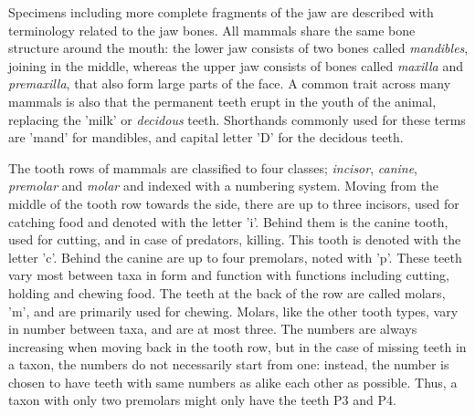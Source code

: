 \documentclass[english,twoside,openright]{HYgraduMLDS}
\begin{document}
Specimens including more complete fragments of the jaw are described with terminology related 
to the jaw bones. All mammals share the same bone structure around the mouth: the lower jaw consists 
of two bones called \textit{mandibles}, joining in the middle, whereas the upper jaw consists of bones called 
\textit{maxilla} and \textit{premaxilla}, that also form large parts of the face.
A common trait across many mammals is also that the permanent teeth erupt in the 
youth of the animal, replacing the 'milk' or \textit{decidous} teeth. Shorthands commonly used for these 
terms are 'mand' for mandibles, and capital letter 'D' for the decidous teeth.

The tooth rows of mammals are classified to four classes; \textit{incisor}, \textit{canine}, \textit{premolar}
and \textit{molar} and indexed with a numbering system. Moving from the middle of the tooth row
towards the side, there are up to three 
incisors, used for catching food and denoted with the letter 'i'. Behind them is the canine tooth, used for cutting, and 
in case of predators, killing. This tooth is denoted with the letter 'c'. Behind the canine are up to four premolars, noted with 'p'. These 
teeth vary most between taxa in form and function with functions including cutting, holding and chewing food.
The teeth at the back of the row are called molars, 'm', and are primarily used for chewing. Molars, like the other tooth types, 
vary in number between taxa, and are at most three. The numbers are always increasing when moving back in the tooth row, but in
 the case of missing teeth in a taxon, the numbers do not necessarily start from one: instead, the number is chosen to 
have teeth with same numbers as alike each other as possible. Thus, a taxon with only two premolars might only have the teeth P3 and P4.
\end{document}

